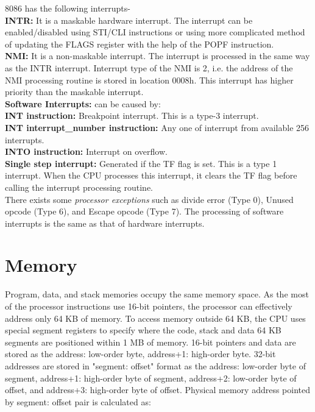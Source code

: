 \documentclass[12pt, a4paper]{scrartcl}
\begin{document}
	8086 has the following interrupts-\\
	
	\textbf{INTR: }It is a maskable hardware interrupt. The interrupt can be enabled/disabled using STI/CLI instructions or using more complicated method of updating the FLAGS register with the help of the POPF instruction.\\
	
	\textbf{NMI: }It is a non-maskable interrupt. The interrupt is processed in the same way as the INTR interrupt. Interrupt type of the NMI is 2, i.e. the address of the NMI processing routine is stored in location 0008h. This interrupt has higher priority than the maskable interrupt.\\
	
	\textbf{Software Interrupts: }can be caused by: \\
	
	\textbf{INT instruction: }Breakpoint interrupt. This is a type-3 interrupt.\\
	
	\textbf{INT interrupt\_number instruction: }Any one of interrupt from available 256 interrupts. \\
	
	\textbf{INTO instruction: }Interrupt on overflow.\\
	
	\textbf{Single step interrupt: }Generated if the TF flag is set. This is a type 1 interrupt. When the CPU processes this interrupt, it clears the TF flag before calling the interrupt processing routine. \\
	
	There exists some \textit{processor exceptions} such as divide error (Type 0), Unused opcode (Type 6), and Escape opcode (Type 7). The processing of software interrupts is the same as that of hardware interrupts.

\section{Memory}
	Program, data, and stack memories occupy the same memory space. As the most of the processor instructions use 16-bit pointers, the processor can effectively address only 64 KB of memory. To access memory outside 64 KB, the CPU uses special segment registers to specify where the code, stack and data 64 KB segments are positioned within 1 MB of memory. 16-bit pointers and data are stored as the address: low-order byte, address+1: high-order byte. 32-bit addresses are stored in "segment: offset" format as the address: low-order byte of segment, address+1: high-order byte of segment, address+2: low-order byte of offset, and address+3: high-order byte of offset. Physical memory address pointed by segment: offset pair is calculated as:\\
	
\end{document}
